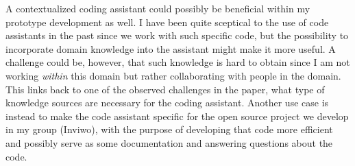 \documentclass[11pt]{article}
\begin{document}
A contextualized coding assistant could possibly be beneficial within my prototype development as well. I have been quite sceptical to the use of code assistants in the past since we work with such specific code, but the possibility to incorporate domain knowledge into the assistant might make it more useful.
A challenge could be, however, that such knowledge is hard to obtain since I am not working \emph{within} this domain but rather collaborating with people in the domain.
This links back to one of the observed challenges in the paper, what type of knowledge sources are necessary for the coding assistant.
Another use case is instead to make the code assistant specific for the open source project we develop in my group (Inviwo), with the purpose of developing that code more efficient and possibly serve as some documentation and answering questions about the code.




\end{document}
